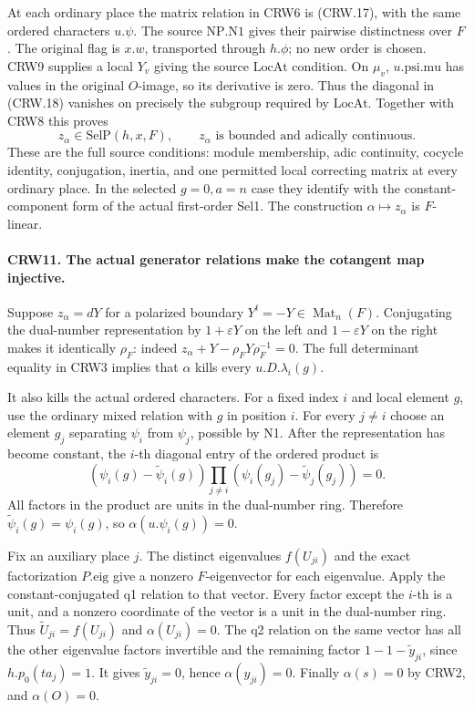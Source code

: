 At each ordinary place the matrix relation in CRW6 is
(CRW.17), with the same ordered characters $u.\psi$.
The source $\mathrm{NP.N1}$ gives their pairwise
distinctness over $F$.  The original flag is $x.w$,
transported through $h.\phi$; no new order is chosen.
CRW9 supplies a local $Y_v$ giving the source
$\mathrm{LocAt}$ condition.
On $\mu_v$, $u.\mathrm{psi.mu}$ has values in the
original $O$-image, so its derivative is zero.
Thus the diagonal in (CRW.18) vanishes on precisely
the subgroup required by $\mathrm{LocAt}$.
Together with CRW8 this proves
\[
 z_\alpha\in\mathrm{SelP}(h,x,F),\qquad
 z_\alpha\text{ is bounded and adically continuous}.\tag{CRW.19}
\]
These are the full source conditions: module membership,
adic continuity, cocycle identity, conjugation, inertia,
and one permitted local correcting matrix at every ordinary
place.  In the selected $g=0,a=n$ case they identify with
the constant-component form of the actual first-order Sel1.
The construction $\alpha\mapsto z_\alpha$ is $F$-linear.

\paragraph{CRW11. The actual generator relations make the cotangent map injective.}
\label{claim:CRW11}
Suppose $z_\alpha=dY$ for a polarized boundary
$Y^t=-Y\in\operatorname{Mat}_n(F)$.
Conjugating the dual-number representation by
$1+\varepsilon Y$ on the left and
$1-\varepsilon Y$ on the right makes it identically
$\rho_F$: indeed
$z_\alpha+Y-\rho_FY\rho_F^{-1}=0$.
The full determinant equality in CRW3 implies that
$\alpha$ kills every $u.D.\lambda_i(g)$.

It also kills the actual ordered characters.
For a fixed index $i$ and local element $g$, use the
ordinary mixed relation with $g$ in position $i$.
For every $j\ne i$ choose an element $g_j$ separating
$\psi_i$ from $\psi_j$, possible by N1.
After the representation has become constant, the $i$-th
diagonal entry of the ordered product is
\[
 (\psi_i(g)-\widetilde\psi_i(g))
 \prod_{j\ne i}
 (\psi_i(g_j)-\widetilde\psi_j(g_j))=0.
\]
All factors in the product are units in the dual-number
ring.  Therefore $\widetilde\psi_i(g)=\psi_i(g)$,
so $\alpha(u.\psi_i(g))=0$.

Fix an auxiliary place $j$.  The distinct eigenvalues
$f(U_{ji})$ and the exact factorization $P.\mathrm{eig}$
give a nonzero $F$-eigenvector for each eigenvalue.
Apply the constant-conjugated q1 relation to that vector.
Every factor except the $i$-th is a unit, and a nonzero
coordinate of the vector is a unit in the dual-number
ring.  Thus $\widetilde U_{ji}=f(U_{ji})$ and
$\alpha(U_{ji})=0$.
The q2 relation on the same vector has all the other
eigenvalue factors invertible and the remaining factor
$1-1-\widetilde y_{ji}$, since $h.p_0(ta_j)=1$.
It gives $\widetilde y_{ji}=0$, hence
$\alpha(y_{ji})=0$.
Finally $\alpha(s)=0$ by CRW2, and $\alpha(O)=0$.


